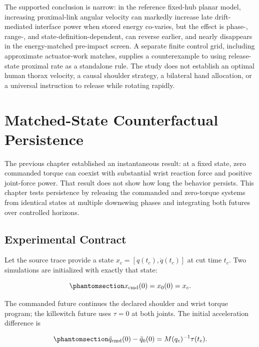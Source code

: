 \documentclass[
  letterpaper,
]{report}
\begin{document}
The supported conclusion is narrow: in the reference fixed-hub planar
model, increasing proximal-link angular velocity can markedly increase
late drift- mediated interface power when stored energy co-varies, but
the effect is phase-, range-, and state-definition-dependent, can
reverse earlier, and nearly disappears in the energy-matched pre-impact
screen. A separate finite control grid, including approximate
actuator-work matches, supplies a counterexample to using release-state
proximal rate as a standalone rule. The study does not establish an
optimal human thorax velocity, a causal shoulder strategy, a bilateral
hand allocation, or a universal instruction to release while rotating
rapidly.

\chapter{Matched-State Counterfactual
Persistence}\label{sec-killswitch-ensemble}

The previous chapter established an instantaneous result: at a fixed
state, zero commanded torque can coexist with substantial wrist reaction
force and positive joint-force power. That result does not show how long
the behavior persists. This chapter tests persistence by releasing the
commanded and zero-torque systems from identical states at multiple
downswing phases and integrating both futures over controlled horizons.

\section{Experimental Contract}\label{sec-ensemble-contract}

Let the source trace provide a state \(x_c=[q(t_c),\dot q(t_c)]\) at cut
time \(t_c\). Two simulations are initialized with exactly that state:

\begin{equation}\phantomsection\label{eq-matched-state-initialization}{
x_{\mathrm{cmd}}(0)=x_0(0)=x_c.
}\end{equation}

The commanded future continues the declared shoulder and wrist torque
program; the killswitch future uses \(\tau=0\) at both joints. The
initial acceleration difference is

\begin{equation}\phantomsection\label{eq-initial-counterfactual-difference}{
\ddot q_{\mathrm{cmd}}(0)-\ddot q_0(0)=M(q_c)^{-1}\tau(t_c).
}\end{equation}
\end{document}

